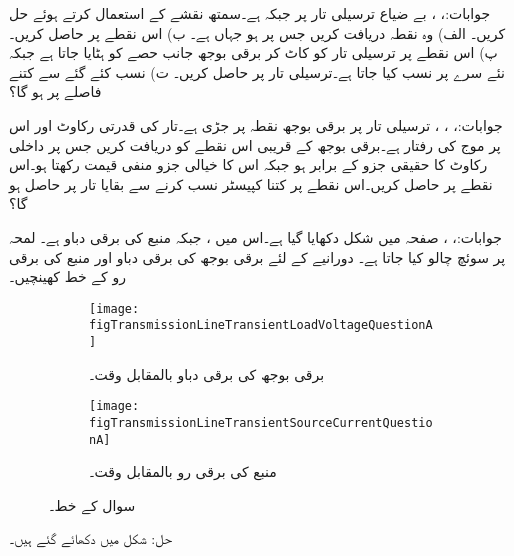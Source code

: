 جوابات:، ، 
بے ضیاع ترسیلی تار پر  جبکہ  ہے۔سمتھ نقشے کے استعمال کرتے ہوئے حل کریں۔ الف) وہ نقطہ دریافت کریں جس پر  ہو جہاں  ہے۔ ب) اس نقطے پر  حاصل کریں۔ پ) اس نقطے پر ترسیلی تار کو کاٹ کر برقی بوجھ جانب حصے کو ہٹایا جاتا ہے جبکہ نئے سرے پر   نسب کیا جاتا ہے۔ترسیلی تار پر  حاصل کریں۔ ت) نسب کئے گئے  سے کتنے فاصلے پر  ہو گا؟

جوابات:، ، ، 
ترسیلی تار پر  برقی بوجھ  نقطہ   پر جڑی ہے۔تار کی قدرتی رکاوٹ  اور اس پر موج کی رفتار  ہے۔برقی بوجھ کے قریبی اس نقطے کو دریافت کریں جس پر داخلی رکاوٹ کا حقیقی جزو  کے برابر ہو جبکہ اس کا خیالی جزو منفی قیمت رکھتا ہو۔اس نقطے پر 
 حاصل کریں۔اس نقطے پر کتنا کپیسٹر نسب کرنے سے بقایا تار پر  حاصل ہو گا؟ 

جوابات:، ، 
صفحہ  میں شکل  دکھایا گیا ہے۔اس میں ،  جبکہ منبع کی برقی دباو  ہے۔ لمحہ  پر سوئچ چالو کیا جاتا ہے۔ دورانیے کے لئے برقی بوجھ  کی برقی دباو اور  منبع کی برقی رو کے خط کھینچیں۔

\begin{figure}
\centering
\begin{subfigure}{0.8\textwidth}
\centering
\texttt{[image: figTransmissionLineTransientLoadVoltageQuestionA]}
\caption{ برقی بوجھ کی برقی دباو بالمقابل وقت۔}
\label{شکل_ترسیلی_جواب_سوال_الف}
\end{subfigure}%

\begin{subfigure}{0.8\textwidth}
\centering
\texttt{[image: figTransmissionLineTransientSourceCurrentQuestionA]}
\caption{منبع کی برقی رو بالمقابل وقت۔}
\label{شکل_ترسیلی_جواب_منبع_رو_سوال_الف}
\end{subfigure}%
\caption{سوال  کے خط۔}
\label{شکل_سوال_ترسیلی_سوال_الف}
\end{figure}
حل: شکل  میں دکھائے گئے ہیں۔

